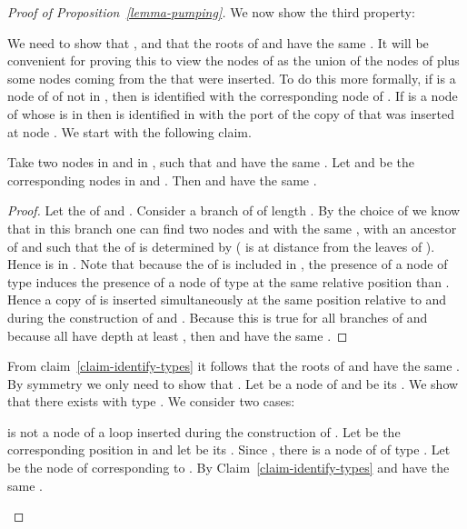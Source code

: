 \begin{proof}[Proof of Proposition~\ref{lemma-pumping}]
We now show the third property:

  \begin{lem}\label{claim-sameblock}
  \end{lem}

\proof
  We need to show that ,  and that
  the roots of  and  have the same . It will be convenient for
  proving this to view the nodes of  as the union of the nodes of  plus
  some nodes coming from the \kloops that were inserted. To do this more
  formally, if  is a node of  of \ktype not in , then  is
  identified with the corresponding node of . If  is a node of  whose
  \ktype is in  then  is identified in  with the port of the copy of
   that was inserted at node .  We start with the following claim.


  \begin{claim} \label{claim-identify-types} Take two nodes  in  and 
    in , such that  and  have the same \type{\kappa}. Let  and  be
    the corresponding nodes in  and . Then  and  have the same
    .
\end{claim}


\begin{proof}
  Let  the \type{\kappa} of  and .  Consider a branch of  of
  length . By the choice of  we know that in this branch one
  can find two nodes  and  with the same \ktypes , with  an
  ancestor of  and such that the \ktype  of  is determined by
   ( is at distance  from the leaves of ). Hence  is
  in .  Note that because the \ktype of  is included in , the
  presence of a node of type  induces the presence of a node of type
   at the same relative position than . Hence a copy of  is
  inserted simultaneously at the same position relative to  and  during the
  construction of  and .  Because this is true for all branches of 
  and because all  have depth at least , then  and  have the
  same .
\end{proof}

From claim~\ref{claim-identify-types} it follows that the roots of  and 
have the same . By symmetry we only need to show that
. Let  be a node of  and  be its . We
show that there exists  with type . We consider two cases:

\begin{iteMize}{}
\item  is not a node of a loop inserted during the construction of . Let
   be the corresponding position in  and let  be its \type{\kappa}. Since
  , there is a node  of  of type . Let 
  be the node of  corresponding to . By
  Claim~\ref{claim-identify-types}  and  have the same .


\end{iteMize}
\end{proof}
